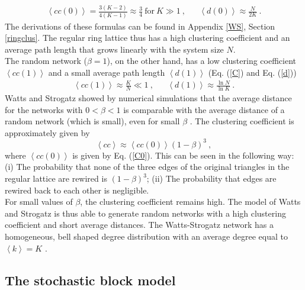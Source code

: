 \documentclass[11 pt , letterpaper , twoside , openright]{book}
\begin{document}
\begin{align}\label{C0}
	\left<cc(0)\right> = \frac{3(K-2)}{4(K-1)} \approx \frac{3}{4} \ \text{for}\ K \gg 1 \ , && \left<d(0)\right> \approx \frac{N}{2K} \ .
\end{align}
The derivations of these formulas can be found in Appendix \ref{WS}, Section \ref{ringclus}. The regular ring lattice thus has a high clustering coefficient and an average path length that grows linearly with the system size $N$. \\
\newline
The random network ($\beta = 1$), on the other hand, has a low clustering coefficient $\left<cc(1)\right>$ and a small average path length $\left<d(1)\right>$ (Eq. (\ref{C}) and Eq. (\ref{d})) \cite{Watts1998}
\begin{align}
	\left<cc(1)\right> \approx \frac{K}{N} \ll 1 \ , && \left<d(1)\right> \approx \frac{\ln{N}}{\ln{K}} \ .
\end{align}
Watts and Strogatz showed by numerical simulations that the average distance for the networks with $0 < \beta < 1$ is comparable with the average distance of a random network (which is small), even for small $\beta$ \cite{Newman2000}. The clustering coefficient is approximately given by \cite{Barrat1999}
\begin{equation}
	\left<cc\right> \approx \left<cc(0)\right>(1-\beta)^3 \ ,
\end{equation} 
where $\left<cc(0)\right>$ is given by Eq. (\ref{C0}). This can be seen in the following way: (i) The probability that none of the three edges of the original triangles in the regular lattice are rewired is $(1-\beta)^3$; (ii) The probability that edges are rewired back to each other is negligible.\\
\newline
For small values of $\beta$, the clustering coefficient remains high. The model of Watts and Strogatz is thus able to generate random networks with a high clustering coefficient and short average distances. The Watts-Strogatz network has a homogeneous, bell shaped degree distribution with an average degree equal to $\left<k\right> = K$ \cite{Barrat1999}.

\subsection{The stochastic block model}
\end{document}
